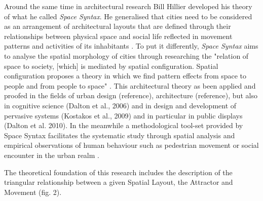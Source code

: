 Around the same time in architectural research Bill Hillier developed his theory of what he called \textit{Space Syntax}. He generalised that cities need to be considered as an arrangement of architectural layouts that are defined through their relationships between physical space and social life reflected in movement patterns and activities of its inhabitants \cite{Hillier_1989}. 
To put it differently, \textit{Space Syntax}  aims to analyse the spatial morphology of cities through researching the "relation of space to society, [which] is mediated by spatial configuration. Spatial configuration proposes a theory in which we find pattern effects from space to people and from people to space" \cite{Hillier1998}. This architectural theory as been applied and proofed in the fields of urban design (reference), architecture (reference), but also in cognitive science (Dalton et al., 2006) and in design and development of pervasive systems (Kostakos et al., 2009) and in particular in public displays (Dalton et al. 2010). In the meanwhile a methodological tool-set provided by Space Syntax facilitates the systematic study through spatial analysis and empirical observations of human behaviour such as pedestrian movement or social encounter in the urban realm \cite{AlSayed2013}.


The theoretical foundation of this research includes the description of the triangular relationship between a given Spatial Layout, the Attractor and Movement (fig. 2).


